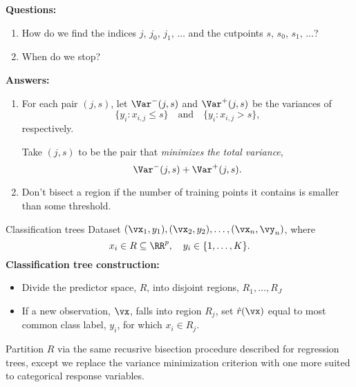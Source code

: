 \documentclass{beamer}
\begin{document}
\begin{frame}{}
    \textbf{Questions:}
    \begin{enumerate}
        \item How do we find the indices $j$, $j_0$, $j_1$, $\ldots$
        and the cutpoints $s$, $s_0$, $s_1$, $\ldots$?
        \item When do we stop?
    \end{enumerate}

    \textbf{Answers:}
    \begin{enumerate}
        \item For each pair $(j, s)$, let $\Var^-(j, s)$ and $\Var^+(j, s)$ be the variances of
        \[
            \{y_i : x_{i,j} \leq s\}\quad\text{and}\quad
            \{y_i : x_{i,j} > s\},
        \]
        respectively.
    
        Take $(j, s)$ to be the pair that \emph{minimizes the total variance},
        \[
            \Var^-(j, s) + \Var^+(j, s).
        \]
    \end{enumerate}
\end{frame}

\begin{frame}{}
    \begin{enumerate}
        \setcounter{enumi}{1}
        \item Don't bisect a region if the number of training points it contains is smaller than some threshold.
    \end{enumerate}
\end{frame}

\begin{frame}{Classification trees}
    Dataset $(\vx_1,y_1), (\vx_2, y_2),\ldots, (\vx_n, \vy_n)$, where 
    \[
    x_i\in R\subseteq\RR^p,\quad y_i\in\{1,\ldots,K\}.
    \]
    \textbf{Classification tree construction:}
    \begin{itemize}
        \item Divide the predictor space, $R$, into disjoint regions, $R_1,\ldots,R_J$
        \item If a new observation, $\vx$, falls into region $R_j$, set
        $\hat r(\vx)$ equal to most common class label, $y_i$, for which $x_i\in R_j$.
    \end{itemize}

    Partition $R$ via the same recusrive bisection procedure described for
    regression trees, except we replace the variance minimization criterion
    with one more suited to categorical response variables.
\end{frame}
\end{document}
